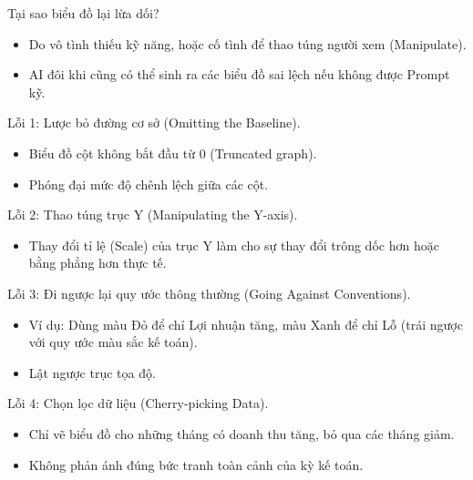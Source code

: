 \documentclass[aspectratio=169]{beamer}
\begin{document}
\begin{frame}{Tại sao biểu đồ lại lừa dối?}
    \begin{itemize}
        \item Do vô tình thiếu kỹ năng, hoặc cố tình để thao túng người xem (Manipulate).
        \item AI đôi khi cũng có thể sinh ra các biểu đồ sai lệch nếu không được Prompt kỹ.
    \end{itemize}
\end{frame}


\begin{frame}{Lỗi 1: Lược bỏ đường cơ sở (Omitting the Baseline).}
    \begin{itemize}
        \item Biểu đồ cột không bắt đầu từ 0 (Truncated graph).
        \item Phóng đại mức độ chênh lệch giữa các cột.
    \end{itemize}
\end{frame}


\begin{frame}{Lỗi 2: Thao túng trục Y (Manipulating the Y-axis).}
    \begin{itemize}
        \item Thay đổi tỉ lệ (Scale) của trục Y làm cho sự thay đổi trông dốc hơn hoặc bằng phẳng hơn thực tế.
    \end{itemize}
\end{frame}


\begin{frame}{Lỗi 3: Đi ngược lại quy ước thông thường (Going Against Conventions).}
    \begin{itemize}
        \item Ví dụ: Dùng màu Đỏ để chỉ Lợi nhuận tăng, màu Xanh để chỉ Lỗ (trái ngược với quy ước màu sắc kế toán).
        \item Lật ngược trục tọa độ.
    \end{itemize}
\end{frame}


\begin{frame}{Lỗi 4: Chọn lọc dữ liệu (Cherry-picking Data).}
    \begin{itemize}
        \item Chỉ vẽ biểu đồ cho những tháng có doanh thu tăng, bỏ qua các tháng giảm.
        \item Không phản ánh đúng bức tranh toàn cảnh của kỳ kế toán.
    \end{itemize}
\end{frame}
\end{document}

